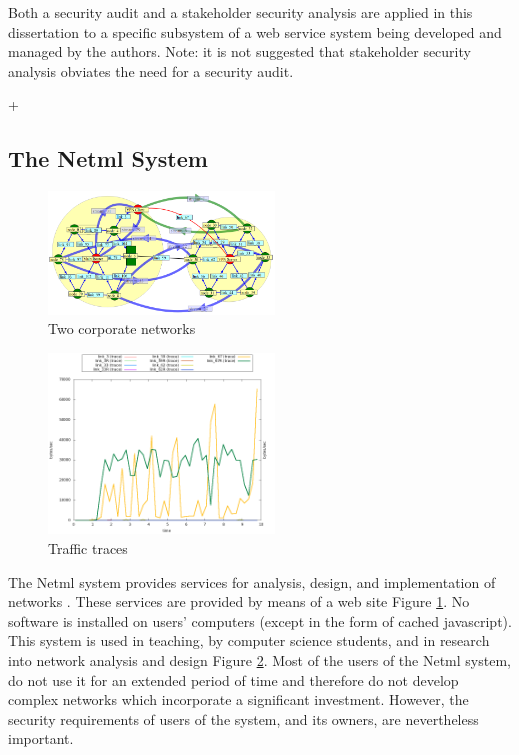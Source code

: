 Both a security audit and a stakeholder security analysis
are applied in this dissertation to a specific subsystem of a web
service system being developed and managed by the authors.
Note: it is not suggested that stakeholder security analysis obviates
the need for a security audit.

+\subsection{The Netml System}
\begin{figure}
	\centering
		\includegraphics[width=6cm]{figures/vpn.png}
\caption{Two corporate networks }
\label{corporatenetwork}
\end{figure}

\begin{figure}
	\centering
		\includegraphics[width=6cm]{figures/vpn_traffic.png}
\caption{Traffic traces}
\label{Traffictraces}
\end{figure}

The Netml system provides services for analysis, design, and implementation
of networks \cite{addie2011netml}. These services are provided by means of a web
site Figure \ref{corporatenetwork}. No software is installed on users' computers (except in the form
of cached javascript). This system is used in teaching, by
computer science students, and in research into network analysis and design Figure  \ref{Traffictraces}. 
\iflonger
Most of the users of the Netml system, do not use it for an extended period of
time and therefore do not develop complex networks which incorporate a significant
investment. However, the security requirements of users of the system, and
its owners, are nevertheless important.
\fi


